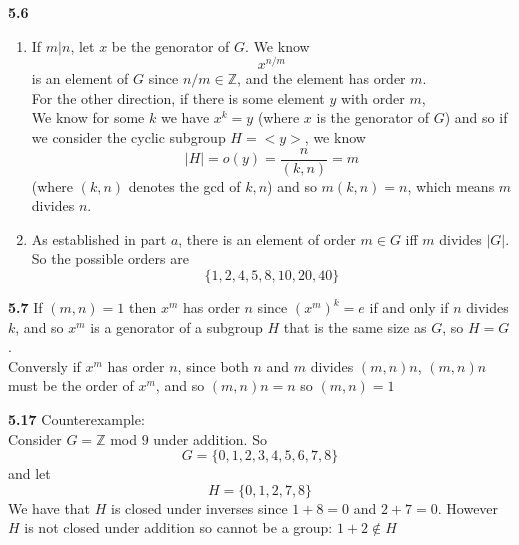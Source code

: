 \documentclass[12pt]{article}
\newenvironment{ques}{\vspace{2 ex}}{\vspace{2 ex}}
\theoremstyle{definition}
\begin{document}
\begin{ques}
	\textbf{5.6}
		\begin{enumerate}
			\item If $m | n$, let $x$ be the genorator of $G$. We know
				$$x^{n/m}$$
				is an element of $G$ since $n/m \in
				\mathbb{Z}$, and the element has order $m$.\\
				For the other direction, if there is some
				element $y$ with order $m$, \\
				We know for some $k$ we have $x^k = y$ (where
				$x$ is the genorator of $G$) and so if we consider the 
				cyclic subgroup $H = <y>$, we know 
				$$|H| = o(y) = \frac{n}{(k,n)} = m$$
				(where $(k,n)$ denotes the gcd of $k,n$) and so
				$m(k,n) = n$, which means $m$ divides $n$.

			\item As established in part $a$, there is an element of
				order $m \in G$ iff $m$ divides $|G|$. So the possible orders
				are
				$$\{1, 2, 4, 5, 8, 10, 20, 40\}$$
		\end{enumerate}
\end{ques}

\begin{ques}
	\textbf{5.7} If $(m,n) = 1$ then $x^m$ has order $n$ since $(x^m)^k =
		e$ if and only if $n$ divides $k$, and so $x^m$ is a genorator
		of a subgroup $H$ that is the same size as $G$, so $H = G$.\\
		Conversly if $x^m$ has order $n$, since both $n$ and $m$
		divides $(m,n)n$, $(m,n)n$ must be the order of $x^m$, and so
		$(m,n)n = n$ so $(m,n) =1$
\end{ques}

\begin{ques} 
	\textbf{5.17} Counterexample:\\
		Consider $G = \mathbb{Z}$ mod $9$ under addition. So
		$$G = \{0, 1, 2, 3, 4, 5, 6, 7, 8\}$$
		and let
		$$H = \{0, 1, 2, 7, 8\}$$
		We have that $H$ is closed under inverses since $1 + 8 = 0$ and
		$2 + 7 = 0$. However $H$ is not closed under addition so cannot
		be a group: $1 + 2 \notin H$
\end{ques}
\end{document}
